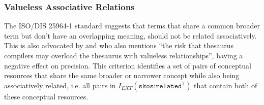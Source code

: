  


\subsubsection{Valueless Associative Relations}
The ISO/DIS 25964-1 standard suggests that terms that share a common broader term but don’t have an overlapping meaning, should not be related associatively. This is also advocated by \cite{Hedden2010} and \cite{Aitchison2000} who also mentions ``the risk that thesaurus compilers may overload the thesaurus with valueless relationships'', having a negative effect on precision. This criterion identifies a set of pairs of conceptual resources that share the same broader or narrower concept while also being associatively related, i.e. all pairs in $I_{EXT}(\texttt{skos:related}^\mathcal{I})$ that contain both of these conceptual resources.

